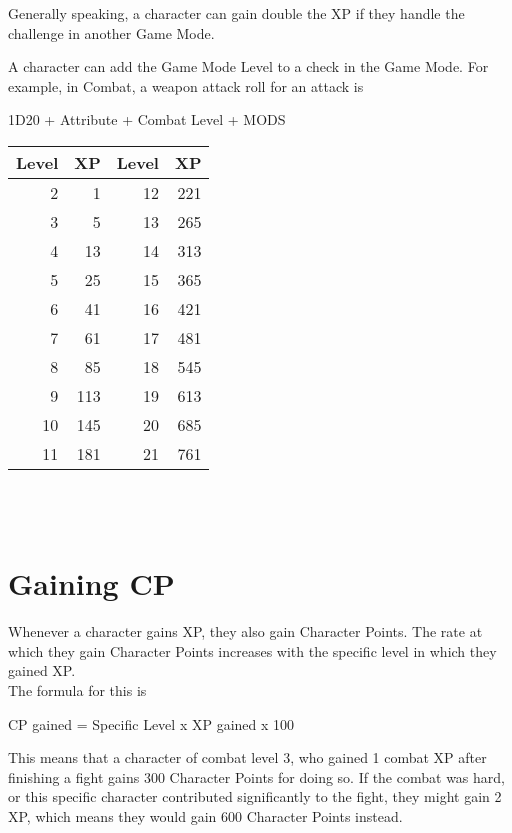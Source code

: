 Generally speaking, a character can gain double the XP if they handle the challenge in another Game Mode.

A character can add the Game Mode Level to a check in the Game Mode. For example, in Combat, a weapon attack roll for an attack is \\
\begin{center}
	
1D20 + Attribute + Combat Level + MODS\\

\begin{tabular}{r r | r r}
Level & XP & Level & XP\\ \hline
2 & 1 & 12 & 221\\
3 & 5 & 13 & 265\\
4 & 13 & 14 & 313\\
5 & 25 & 15 & 365\\
6 & 41 & 16 & 421\\
7 & 61 & 17 & 481\\
8 & 85 & 18 & 545\\
9 & 113 & 19 & 613\\
10 & 145 & 20 & 685\\
11 & 181 & 21 & 761\\
\end{tabular}\\~\\

\end{center}

\section{Gaining CP}

Whenever a character gains XP, they also gain Character Points. The rate at which they gain Character Points increases with the specific level in which they gained XP.\\
The formula for this is\\

\begin{center}
	CP gained = Specific Level x XP gained  x 100
\end{center}

This means that a character of combat level 3, who gained 1 combat XP after finishing a fight gains 300 Character Points for doing so. If the combat was hard, or this specific character contributed significantly to the fight, they might gain 2 XP, which means they would gain 600 Character Points instead.\\


